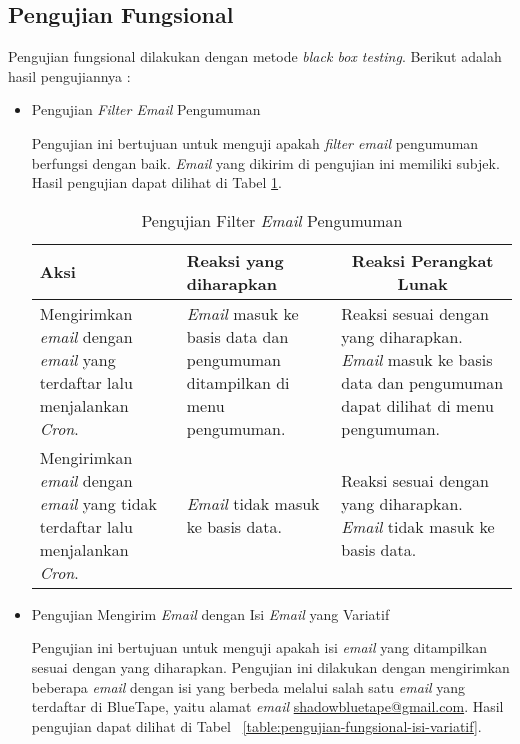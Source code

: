\subsection{Pengujian Fungsional}
Pengujian fungsional dilakukan dengan metode \textit{black box testing}. Berikut adalah hasil pengujiannya :
\begin{itemize}
  \item Pengujian \textit{Filter Email} Pengumuman

    Pengujian ini bertujuan untuk menguji apakah \textit{filter email} pengumuman berfungsi dengan baik. \textit{Email} yang dikirim di pengujian ini memiliki subjek. Hasil pengujian dapat dilihat di Tabel \ref{table:pengujian-fungsional-filter-email}.

    \begin{center}
      \begin{table}[H]
        \caption{Pengujian Filter \textit{Email} Pengumuman}
        \label{table:pengujian-fungsional-filter-email}
        \begin{tabular}{|p{5cm}|p{5cm}|p{5cm}|}
        \hline
        \centering Aksi	& 	\centering Reaksi yang diharapkan &  \multicolumn{1}{c|}{Reaksi Perangkat Lunak} \\
        \hline
        Mengirimkan \textit{email} dengan \textit{email} yang terdaftar lalu menjalankan \textit{Cron}. & \textit{Email} masuk ke basis data dan pengumuman ditampilkan di menu pengumuman. & Reaksi sesuai dengan yang diharapkan. \textit{Email} masuk ke basis data dan pengumuman dapat dilihat di menu pengumuman. \\
        \hline
        Mengirimkan \textit{email} dengan \textit{email} yang tidak terdaftar lalu menjalankan \textit{Cron}. & \textit{Email} tidak masuk ke basis data. & Reaksi sesuai dengan yang diharapkan. \textit{Email} tidak masuk ke basis data. \\
        \hline
        \end{tabular}
    \end{table}
    \end{center}

  \item Pengujian Mengirim \textit{Email} dengan Isi \textit{Email} yang Variatif

    Pengujian ini bertujuan untuk menguji apakah isi \textit{email} yang ditampilkan sesuai dengan yang diharapkan. Pengujian ini dilakukan dengan mengirimkan beberapa \textit{email} dengan isi yang berbeda melalui salah satu \textit{email} yang terdaftar di BlueTape, yaitu alamat \textit{email} \href{mailto:shadowbluetape@gmail.com}{shadowbluetape@gmail.com}. Hasil pengujian dapat dilihat di Tabel ~\ref{table:pengujian-fungsional-isi-variatif}.


\end{itemize}
